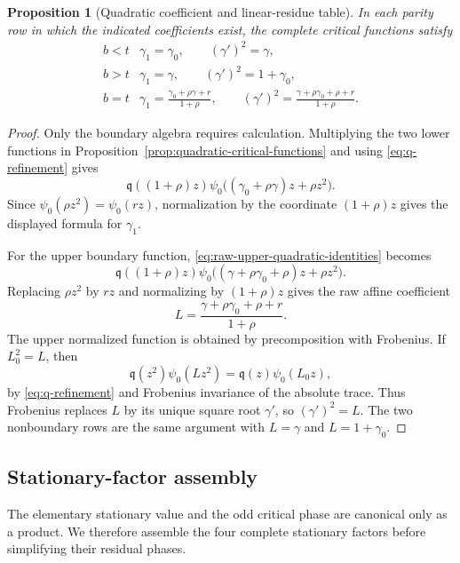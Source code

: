 \documentclass[11pt]{amsart}
\newtheorem{proposition}[theorem]{Proposition}
\theoremstyle{definition}
\theoremstyle{remark}
\begin{document}
\begin{proposition}[Quadratic coefficient and linear-residue table]
\label{prop:quadratic-gamma-table}
In each parity row in which the indicated coefficients exist, the
complete critical functions satisfy
\begin{equation}\label{eq:quadratic-gamma-table}
\begin{array}{c|c}
 b<t&\gamma_1=\gamma_0,
       \qquad (\gamma')^2=\gamma,\\[2mm]
 b>t&\gamma_1=\gamma,
       \qquad (\gamma')^2=1+\gamma_0,\\[2mm]
 b=t&\displaystyle
 \gamma_1=\frac{\gamma_0+\rho\gamma+r}{1+\rho},
 \qquad
 (\gamma')^2=
 \frac{\gamma+\rho\gamma_0+\rho+r}{1+\rho}.
\end{array}
\end{equation}
\end{proposition}

\begin{proof}
Only the boundary algebra requires calculation.  Multiplying the two
lower functions in Proposition~\ref{prop:quadratic-critical-functions} and using
\eqref{eq:q-refinement} gives
\[
 \mathfrak q((1+\rho)z)
 \psi_0\bigl((\gamma_0+\rho\gamma)z+\rho z^2\bigr).
\]
Since $\psi_0(\rho z^2)=\psi_0(rz)$, normalization by the coordinate
$(1+\rho)z$ gives the displayed formula for $\gamma_1$.

For the upper boundary function,
\eqref{eq:raw-upper-quadratic-identities} becomes
\[
 \mathfrak q((1+\rho)z)
 \psi_0\bigl((\gamma+\rho\gamma_0+\rho)z+\rho z^2\bigr).
\]
Replacing $\rho z^2$ by $rz$ and normalizing by $(1+\rho)z$ gives the
raw affine coefficient
\[
 L=\frac{\gamma+\rho\gamma_0+\rho+r}{1+\rho}.
\]
The upper normalized function is obtained by precomposition with
Frobenius.  If $L_0^2=L$, then
\[
 \mathfrak q(z^2)\psi_0(Lz^2)
 =\mathfrak q(z)\psi_0(L_0z),
\]
by \eqref{eq:q-refinement} and Frobenius invariance of the absolute
trace.  Thus Frobenius replaces $L$ by its unique square root
$\gamma'$, so $(\gamma')^2=L$.  The two nonboundary rows are the same
argument with $L=\gamma$ and $L=1+\gamma_0$.
\end{proof}

\subsection{Stationary-factor assembly}

The elementary stationary value and the odd critical phase are canonical
only as a product.  We therefore assemble the four complete stationary
factors before simplifying their residual phases.
\end{document}
